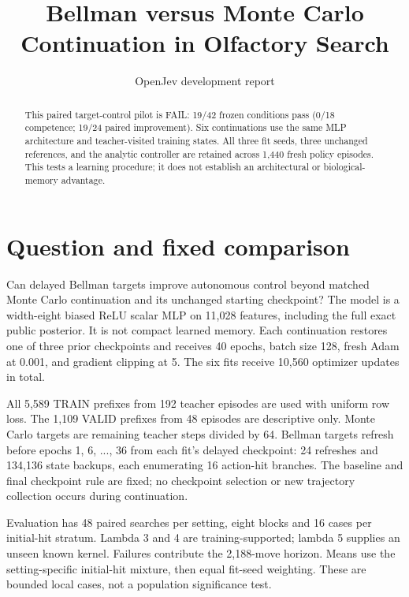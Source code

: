 \documentclass[10pt]{article}
\title{Bellman versus Monte Carlo Continuation in Olfactory Search}
\author{OpenJev development report}\date{}
\begin{document}
\maketitle\vspace{-1em}
\begin{abstract}
This paired target-control pilot is FAIL: 19/42 frozen conditions pass (0/18 competence; 19/24 paired improvement). Six continuations use the same MLP architecture and teacher-visited training states. All three fit seeds, three unchanged references, and the analytic controller are retained across 1,440 fresh policy episodes. This tests a learning procedure; it does not establish an architectural or biological-memory advantage.\par
\end{abstract}
\section{Question and fixed comparison}
Can delayed Bellman targets improve autonomous control beyond matched Monte Carlo continuation and its unchanged starting checkpoint? The model is a width-eight biased ReLU scalar MLP on 11,028 features, including the full exact public posterior. It is not compact learned memory. Each continuation restores one of three prior checkpoints and receives 40 epochs, batch size 128, fresh Adam at 0.001, and gradient clipping at 5. The six fits receive 10,560 optimizer updates in total.\par
All 5,589 TRAIN prefixes from 192 teacher episodes are used with uniform row loss. The 1,109 VALID prefixes from 48 episodes are descriptive only. Monte Carlo targets are remaining teacher steps divided by 64. Bellman targets refresh before epochs 1, 6, ..., 36 from each fit's delayed checkpoint: 24 refreshes and 134,136 state backups, each enumerating 16 action-hit branches. The baseline and final checkpoint rule are fixed; no checkpoint selection or new trajectory collection occurs during continuation.\par
Evaluation has 48 paired searches per setting, eight blocks and 16 cases per initial-hit stratum. Lambda 3 and 4 are training-supported; lambda 5 supplies an unseen known kernel. Failures contribute the 2,188-move horizon. Means use the setting-specific initial-hit mixture, then equal fit-seed weighting. These are bounded local cases, not a population significance test.\par
\end{document}
